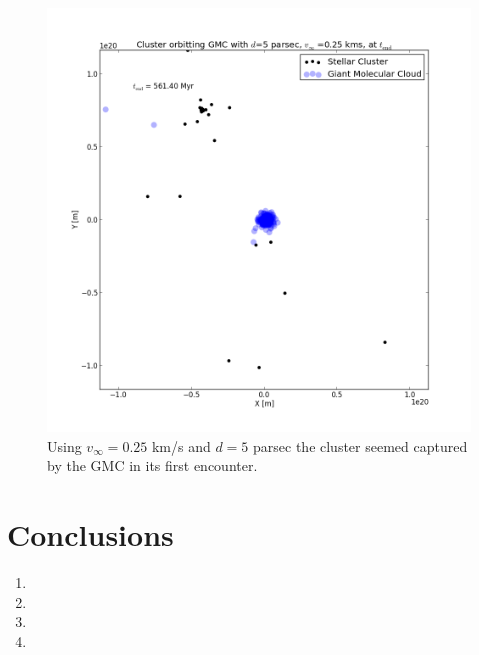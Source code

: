 \documentclass{aa}
\begin{document}
\begin{figure}[h!]
    \centering
    \includegraphics[width=\hsize]{img/v_25_d_5_second_encounter.png}
    \caption{Using $v_\infty = 0.25$ km/s and $d = 5$ parsec the cluster seemed captured by the GMC in its first encounter.}\label{fig:v_25_d_5_sec}
\end{figure}







\section{Conclusions}\label{sec:conclusions}
\begin{enumerate}
    \item
    \item
    \item
    \item
\end{enumerate}
\end{document}
